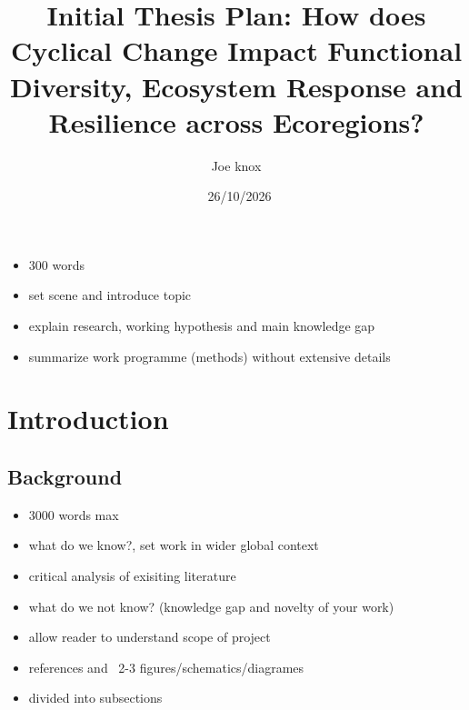 \documentclass[11pt]{report}
\title{Initial Thesis Plan: How does Cyclical Change Impact Functional Diversity, Ecosystem Response and Resilience across Ecoregions?}
\author{Joe knox}
\date{\ 26/10/2026}
\begin{document}


\maketitle

\tableofcontents


\abstract

\begin{itemize}
\item 300 words
\item set scene and introduce topic
\item explain research, working hypothesis and main knowledge gap
\item summarize work programme (methods) without extensive details
\end{itemize}
 

\section{Introduction}\label{sec1}

\subsection{Background}\label{subsec1}

\begin{itemize}
\item 3000 words max
\item what do we know?, set work in wider global context
\item critical analysis of exisiting literature
\item what do we not know? (knowledge gap and novelty of your work)
\item allow reader to understand scope of project
\item references and ~2-3 figures/schematics/diagrames
\item divided into subsections
\end{itemize}
\end{document}
